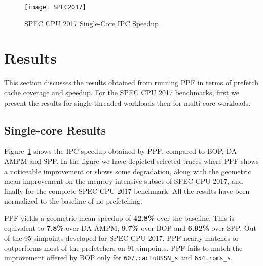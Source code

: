 \begin{figure}[ht]
\texttt{[image: SPEC2017]}
\caption{SPEC CPU 2017 Single-Core IPC Speedup}
\label{Fig:SPEC2017_1core}
\end{figure}

\section{Results}
\label{Results}

This section discusses the results obtained from running PPF in terms of
prefetch cache coverage and speedup. For the SPEC CPU 2017 benchmarks, first
we present the results for single-threaded workloads then for multi-core
workloads.

\subsection{Single-core Results}
\label{Results-Single}


Figure~\ref{Fig:SPEC2017_1core} shows the IPC speedup obtained by PPF,
compared to BOP, DA-AMPM and SPP. In the figure we have depicted selected
traces where PPF shows a noticeable improvement or shows some degradation,
along with the geometric mean improvement on the memory intensive subset of
SPEC CPU 2017, and finally for the complete SPEC CPU 2017 benchmark. All the
results have been normalized to the baseline of no prefetching.


PPF yields a geometric mean speedup of \textbf{42.8\%} over the baseline. 
This is equivalent to \textbf{7.8\%} over DA-AMPM, \textbf{9.7\%} over BOP 
and \textbf{6.92\%} over SPP. Out of the 95 simpoints developed for SPEC 
CPU 2017, PPF nearly matches or outperforms most of the prefetchers on 91 
simpoints. PPF fails to match the improvement offered by BOP only for 
{\tt 607.cactuBSSN\_s} and {\tt 654.roms\_s}.

